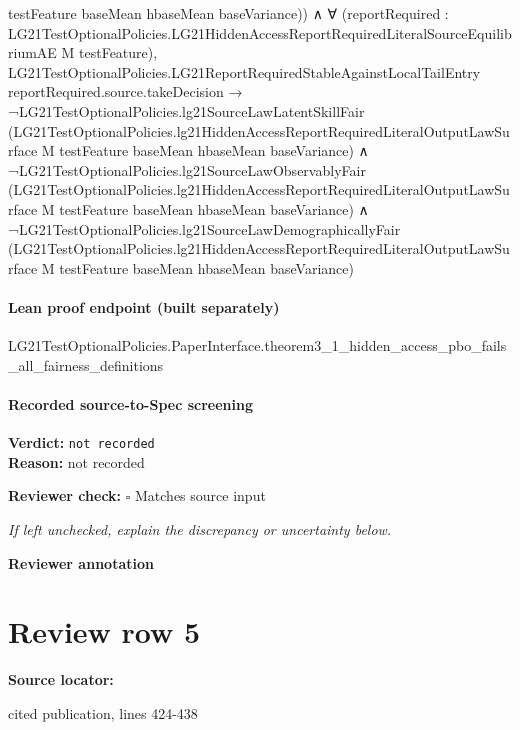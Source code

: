 \documentclass[10pt]{article}
\newcommand{\reviewerbox}{%
  \par\noindent\fbox{\parbox{0.96\linewidth}{\rule{0pt}{0.38in}}}\par
}
\newcommand{\reviewmatch}[1]{%
  \par\noindent\textbf{Reviewer check:} $\square$\; #1\par
  \noindent\emph{If left unchecked, explain the discrepancy or uncertainty below.}\par
}
\begin{document}
\begin{ReviewVerbatim}
                                    testFeature baseMean hbaseMean baseVariance)) ∧
                    ∀
                      (reportRequired :
                        LG21TestOptionalPolicies.LG21HiddenAccessReportRequiredLiteralSourceEquilibriumAE M
                          testFeature),
                      LG21TestOptionalPolicies.LG21ReportRequiredStableAgainstLocalTailEntry
                          reportRequired.source.takeDecision →
                        ¬LG21TestOptionalPolicies.lg21SourceLawLatentSkillFair
                              (LG21TestOptionalPolicies.lg21HiddenAccessReportRequiredLiteralOutputLawSurface M
                                testFeature baseMean hbaseMean baseVariance) ∧
                          ¬LG21TestOptionalPolicies.lg21SourceLawObservablyFair
                                (LG21TestOptionalPolicies.lg21HiddenAccessReportRequiredLiteralOutputLawSurface M
                                  testFeature baseMean hbaseMean baseVariance) ∧
                            ¬LG21TestOptionalPolicies.lg21SourceLawDemographicallyFair
                                (LG21TestOptionalPolicies.lg21HiddenAccessReportRequiredLiteralOutputLawSurface M
                                  testFeature baseMean hbaseMean baseVariance)
\end{ReviewVerbatim}

\paragraph{Lean proof endpoint (built separately)}\begin{ReviewVerbatim}
LG21TestOptionalPolicies.PaperInterface.theorem3_1_hidden_access_pbo_fails_all_fairness_definitions
\end{ReviewVerbatim}

\paragraph{Recorded source-to-Spec screening}
\textbf{Verdict:} \texttt{not recorded}
\\
\textbf{Reason:} not recorded
\reviewmatch{Matches source input}
\noindent\textbf{Reviewer annotation}\par
\reviewerbox
\clearpage
\hypertarget{source-claim-6c73f99151b1b2c7}{}
\section*{Review row 5}
\textbf{Source locator:} {\footnotesize\raggedright cited publication, lines 424-\allowbreak{}438\par}
\end{document}
